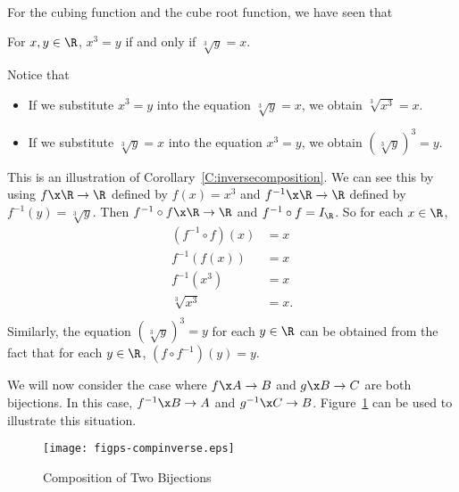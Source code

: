 \begin{example} \hfill \\
For the cubing function and the cube root function, we have seen that
\begin{center}
For  $x, y \in \R$,  $x^3  = y$  if and only if  $\sqrt[3]{y} = x$.
\end{center}
Notice that
\begin{itemize}
\item If we substitute  $x^3  = y$ into the equation  $\sqrt[3]{y} = x$, we obtain
$\sqrt[3]{{x^3 }} = x$.

\item If we substitute  $\sqrt[3]{y} = x$ into the equation  $x^3  = y$, we obtain 
$\left( {\sqrt[3]{y}} \right)^3  = y$.
\end{itemize}
This is an illustration of Corollary~\ref{C:inversecomposition}.  We can see this by using 
$f\x \R \to \R$  defined by  $f( x ) = x^3 $ and   
$f^{ - 1} \x \R \to \R$  defined by  $f^{ - 1} ( y ) = \sqrt[3]{y}$.   Then  
$f^{ - 1}  \circ f\x \R \to \R$ and $f^{ - 1}  \circ f = I_\R $.  So for each $x \in \R$,
\[
\begin{aligned}
  \left( {f^{ - 1}  \circ f} \right)( x ) &= x \\ 
      f^{ - 1} \! \left( {f( x )} \right) &= x \\ 
         f^{ - 1} \!\left( {x^3 } \right) &= x \\ 
                         \sqrt[3]{{x^3 }} &= x. \\ 
\end{aligned}
\]
Similarly, the equation  $\left( {\sqrt[3]{y}} \right)^3  = y$ for each  $y \in \R$ can be obtained from the fact that for each $y \in \R$,  $(f \circ f^{ - 1})(y) = y$.
\end{example}
\hbreak
%
\addtocounter{theorem}{1}
%

We will now consider the case where  $f\x A \to B$  and  $g\x B \to C$  are both bijections.   In this case,  $f^{ - 1} \x B \to A$  and  $g^{ - 1} \x C \to B$.  
Figure~\ref {fig:bijectioncomposition} can be used to illustrate this situation.
\begin{figure}[h]
\begin{center}
\texttt{[image: figps-compinverse.eps]}
\caption{Composition of Two Bijections} \label{fig:bijectioncomposition}
\end{center}
\end{figure}

